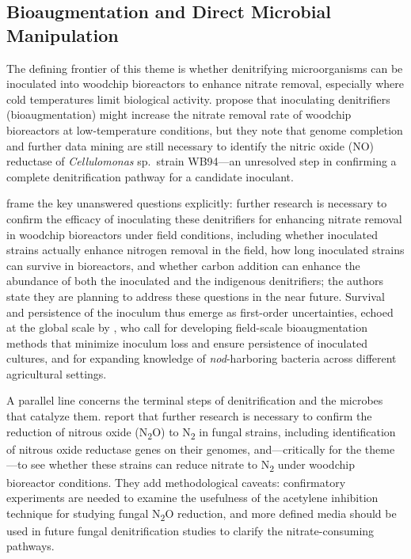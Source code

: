 \documentclass[11pt]{article}
\begin{document}
\subsection{Bioaugmentation and Direct Microbial Manipulation}
The defining frontier of this theme is whether denitrifying microorganisms can be inoculated into woodchip bioreactors to enhance nitrate removal, especially where cold temperatures limit biological activity. \textcite{Jang2019} propose that inoculating denitrifiers (bioaugmentation) might increase the nitrate removal rate of woodchip bioreactors at low-temperature conditions, but they note that genome completion and further data mining are still necessary to identify the nitric oxide (NO) reductase of \emph{Cellulomonas} sp.\ strain WB94---an unresolved step in confirming a complete denitrification pathway for a candidate inoculant.

\textcite{Anderson2020} frame the key unanswered questions explicitly: further research is necessary to confirm the efficacy of inoculating these denitrifiers for enhancing nitrate removal in woodchip bioreactors under field conditions, including whether inoculated strains actually enhance nitrogen removal in the field, how long inoculated strains can survive in bioreactors, and whether carbon addition can enhance the abundance of both the inoculated and the indigenous denitrifiers; the authors state they are planning to address these questions in the near future. Survival and persistence of the inoculum thus emerge as first-order uncertainties, echoed at the global scale by \textcite{Wang2025b}, who call for developing field-scale bioaugmentation methods that minimize inoculum loss and ensure persistence of inoculated cultures, and for expanding knowledge of \emph{nod}-harboring bacteria across different agricultural settings.

A parallel line concerns the terminal steps of denitrification and the microbes that catalyze them. \textcite{Aldossari2021} report that further research is necessary to confirm the reduction of nitrous oxide (N\textsubscript{2}O) to N\textsubscript{2} in fungal strains, including identification of nitrous oxide reductase genes on their genomes, and---critically for the theme---to see whether these strains can reduce nitrate to N\textsubscript{2} under woodchip bioreactor conditions. They add methodological caveats: confirmatory experiments are needed to examine the usefulness of the acetylene inhibition technique for studying fungal N\textsubscript{2}O reduction, and more defined media should be used in future fungal denitrification studies to clarify the nitrate-consuming pathways.
\end{document}
